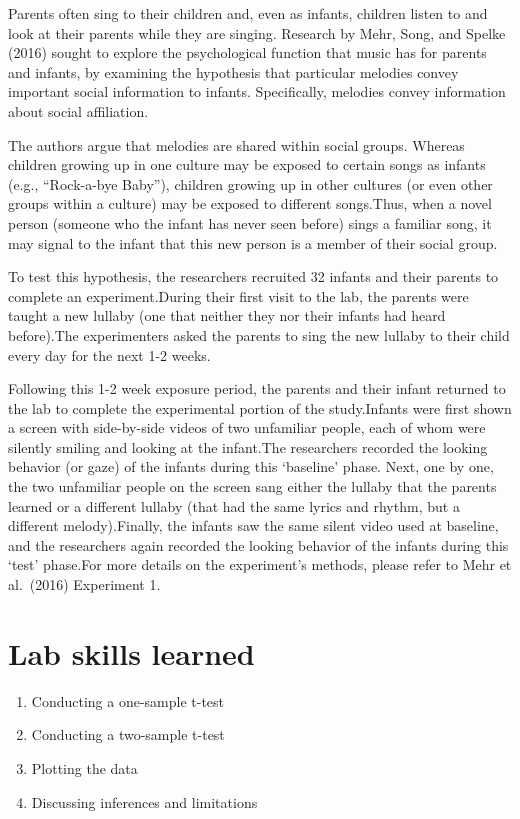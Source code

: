 \documentclass[
]{book}
\providecommand{\tightlist}{%
  \setlength{\itemsep}{0pt}\setlength{\parskip}{0pt}}
\begin{document}
Parents often sing to their children and, even as infants, children listen to and look at their parents while they are singing. Research by Mehr, Song, and Spelke (2016) sought to explore the psychological function that music has for parents and infants, by examining the hypothesis that particular melodies convey important social information to infants. Specifically, melodies convey information about social affiliation.

The authors argue that melodies are shared within social groups. Whereas children growing up in one culture may be exposed to certain songs as infants (e.g., ``Rock-a-bye Baby''), children growing up in other cultures (or even other groups within a culture) may be exposed to different songs.Thus, when a novel person (someone who the infant has never seen before) sings a familiar song, it may signal to the infant that this new person is a member of their social group.

To test this hypothesis, the researchers recruited 32 infants and their parents to complete an experiment.During their first visit to the lab, the parents were taught a new lullaby (one that neither they nor their infants had heard before).The experimenters asked the parents to sing the new lullaby to their child every day for the next 1-2 weeks.

Following this 1-2 week exposure period, the parents and their infant returned to the lab to complete the experimental portion of the study.Infants were first shown a screen with side-by-side videos of two unfamiliar people, each of whom were silently smiling and looking at the infant.The researchers recorded the looking behavior (or gaze) of the infants during this `baseline' phase. Next, one by one, the two unfamiliar people on the screen sang either the lullaby that the parents learned or a different lullaby (that had the same lyrics and rhythm, but a different melody).Finally, the infants saw the same silent video used at baseline, and the researchers again recorded the looking behavior of the infants during this `test' phase.For more details on the experiment's methods, please refer to Mehr et al.~(2016) Experiment 1.

\hypertarget{lab-skills-learned}{%
\section{Lab skills learned}\label{lab-skills-learned}}

\begin{enumerate}
\def\labelenumi{\arabic{enumi}.}
\tightlist
\item
  Conducting a one-sample t-test
\item
  Conducting a two-sample t-test
\item
  Plotting the data
\item
  Discussing inferences and limitations
\end{enumerate}
\end{document}
